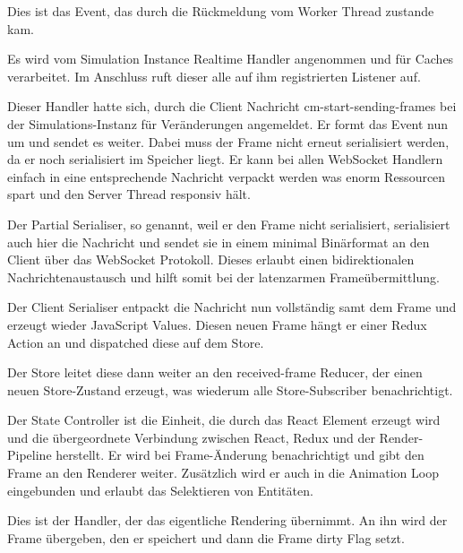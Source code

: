 \begin{itemize}
     Dies ist das Event, das durch die Rückmeldung vom Worker Thread zustande kam.

     Es wird vom Simulation Instance Realtime Handler angenommen und für Caches verarbeitet.
    Im Anschluss ruft dieser alle auf ihm registrierten Listener auf.

     Dieser Handler hatte sich, durch die Client Nachricht cm-start-sending-frames bei der Simulations-Instanz für Veränderungen angemeldet.
    Er formt das Event nun um und sendet es weiter.
    Dabei muss der Frame nicht erneut serialisiert werden, da er noch serialisiert im Speicher liegt.
    Er kann bei allen WebSocket Handlern einfach in eine entsprechende Nachricht verpackt werden was enorm Ressourcen spart und den Server Thread responsiv hält.

     Der Partial Serialiser, so genannt, weil er den Frame nicht serialisiert, serialisiert auch hier die Nachricht und sendet sie in einem minimal Binärformat an den Client über das WebSocket Protokoll.
    Dieses erlaubt einen bidirektionalen Nachrichtenaustausch und hilft somit bei der latenzarmen Frameübermittlung.

     Der Client Serialiser entpackt die Nachricht nun vollständig samt dem Frame und erzeugt wieder JavaScript Values.
    Diesen neuen Frame hängt er einer Redux Action an und dispatched diese auf dem Store.

     Der Store leitet diese dann weiter an den received-frame Reducer, der einen neuen Store-Zustand erzeugt, was wiederum alle Store-Subscriber benachrichtigt.

     Der State Controller ist die Einheit, die durch das React Element erzeugt wird und die übergeordnete Verbindung zwischen React, Redux und der Render-Pipeline herstellt.
    Er wird bei Frame-Änderung benachrichtigt und gibt den Frame an den Renderer weiter.
    Zusätzlich wird er auch in die Animation Loop eingebunden und erlaubt das Selektieren von Entitäten.

     Dies ist der Handler, der das eigentliche Rendering übernimmt.
    An ihn wird der Frame übergeben, den er speichert und dann die Frame dirty Flag setzt.
\end{itemize}

